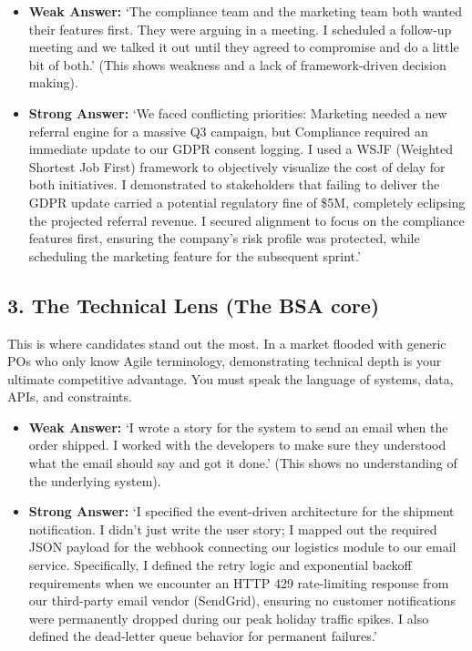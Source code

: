 \begin{itemize}
\tightlist
\item
  \textbf{Weak Answer:} `The compliance team and the marketing team both
  wanted their features first. They were arguing in a meeting. I
  scheduled a follow-up meeting and we talked it out until they agreed
  to compromise and do a little bit of both.' (This shows weakness and a
  lack of framework-driven decision making).
\item
  \textbf{Strong Answer:} `We faced conflicting priorities: Marketing
  needed a new referral engine for a massive Q3 campaign, but Compliance
  required an immediate update to our GDPR consent logging. I used a
  WSJF (Weighted Shortest Job First) framework to objectively visualize
  the cost of delay for both initiatives. I demonstrated to stakeholders
  that failing to deliver the GDPR update carried a potential regulatory
  fine of \$5M, completely eclipsing the projected referral revenue. I
  secured alignment to focus on the compliance features first, ensuring
  the company's risk profile was protected, while scheduling the
  marketing feature for the subsequent sprint.'
\end{itemize}

\subsection{3. The Technical Lens (The BSA
core)}\label{the-technical-lens-the-bsa-core}

This is where candidates stand out the most. In a market flooded with
generic POs who only know Agile terminology, demonstrating technical
depth is your ultimate competitive advantage. You must speak the
language of systems, data, APIs, and constraints.

\begin{itemize}
\tightlist
\item
  \textbf{Weak Answer:} `I wrote a story for the system to send an email
  when the order shipped. I worked with the developers to make sure they
  understood what the email should say and got it done.' (This shows no
  understanding of the underlying system).
\item
  \textbf{Strong Answer:} `I specified the event-driven architecture for
  the shipment notification. I didn't just write the user story; I
  mapped out the required JSON payload for the webhook connecting our
  logistics module to our email service. Specifically, I defined the
  retry logic and exponential backoff requirements when we encounter an
  HTTP 429 rate-limiting response from our third-party email vendor
  (SendGrid), ensuring no customer notifications were permanently
  dropped during our peak holiday traffic spikes. I also defined the
  dead-letter queue behavior for permanent failures.'
\end{itemize}

